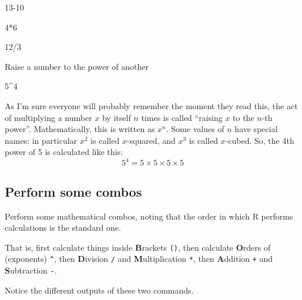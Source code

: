\documentclass[
]{book}
\newenvironment{Shaded}{\begin{snugshade}}{\end{snugshade}}
\newcommand{\DecValTok}[1]{\textcolor[rgb]{0.00,0.00,0.81}{#1}}
\newcommand{\SpecialCharTok}[1]{\textcolor[rgb]{0.00,0.00,0.00}{#1}}
\begin{document}
\begin{Shaded}
\begin{Highlighting}[]
\DecValTok{13{-}10}
\end{Highlighting}
\end{Shaded}

\begin{Shaded}
\begin{Highlighting}[]
\DecValTok{4}\SpecialCharTok{*}\DecValTok{6}
\end{Highlighting}
\end{Shaded}

\begin{Shaded}
\begin{Highlighting}[]
\DecValTok{12}\SpecialCharTok{/}\DecValTok{3}
\end{Highlighting}
\end{Shaded}

Raise a number to the power of another

\begin{Shaded}
\begin{Highlighting}[]
\DecValTok{5}\SpecialCharTok{\^{}}\DecValTok{4}
\end{Highlighting}
\end{Shaded}

As I'm sure everyone will probably remember the moment they read this, the act of multiplying a number \(x\) by itself \(n\) times is called ``raising \(x\) to the \(n\)-th power''. Mathematically, this is written as \(x^n\). Some values of \(n\) have special names: in particular \(x^2\) is called \(x\)-squared, and \(x^3\) is called \(x\)-cubed. So, the 4th power of 5 is calculated like this:
\[
5^4 = 5 \times 5 \times 5 \times 5 
\]

\hypertarget{perform-some-combos}{%
\subsection{Perform some combos}\label{perform-some-combos}}

Perform some mathematical combos, noting that the order in which R performs calculations is the standard one.

That is, first calculate things inside \textbf{B}rackets \texttt{()}, then calculate \textbf{O}rders of (exponents) \texttt{\^{}}, then \textbf{D}ivision \texttt{/} and \textbf{M}ultiplication \texttt{*}, then \textbf{A}ddition \texttt{+} and \textbf{S}ubtraction \texttt{-}.

Notice the different outputs of these two commands.
\end{document}
